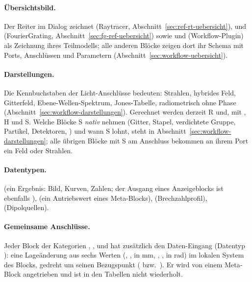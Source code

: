 \paragraph{Übersichtsbild.} Der Reiter  im Dialog  zeichnet
 (Raytracer, Abschnitt~\ref{sec:ref-rt-uebersicht}),  und
 (FourierGrating, Abschnitt~\ref{sec:fg-ref-uebersicht}) sowie 
und  (Workflow-Plugin) als Zeichnung ihres Teilmodells; alle anderen Blöcke
zeigen dort ihr Schema mit Ports, Anschlüssen und Parametern (Abschnitt~\ref{sec:workflow-uebersicht}).

\paragraph{Darstellungen.} Die Kennbuchstaben der Licht-Anschlüsse bedeuten:
 Strahlen,  hybrides Feld,  Gitterfeld,  Ebene-Wellen-Spektrum,
 Jones-Tabelle,  radiometrisch ohne Phase
(Abschnitt~\ref{sec:workflow-darstellungen}). Gerechnet werden derzeit R und, mit
, H und S. Welche Blöcke S \emph{nativ} nehmen (Gitter, Stapel, verdichtete
Gruppe, Partikel, Detektoren, ) und wann S lohnt, steht in
Abschnitt~\ref{sec:workflow-darstellungen}; alle übrigen Blöcke mit S am Anschluss bekommen an
ihrem Port ein Feld oder Strahlen.

\paragraph{Datentypen.}  (ein Ergebnis: Bild, Kurven, Zahlen; der Ausgang
 eines Anzeigeblocks ist ebenfalls ),  (ein Antriebswert
eines Meta-Blocks),  (Brechzahlprofil),  (Dipolquellen).

\paragraph{Gemeinsame Anschlüsse.} Jeder Block der Kategorien , ,
 und  hat zusätzlich den Daten-Eingang  (Datentyp
): eine Lageänderung aus sechs Werten (, ,  in mm,
, ,  in rad) im lokalen System des Blocks, gedreht um seinen
Bezugspunkt ( bzw.\ ). Er wird von einem Meta-Block angetrieben
und ist in den Tabellen nicht wiederholt.

